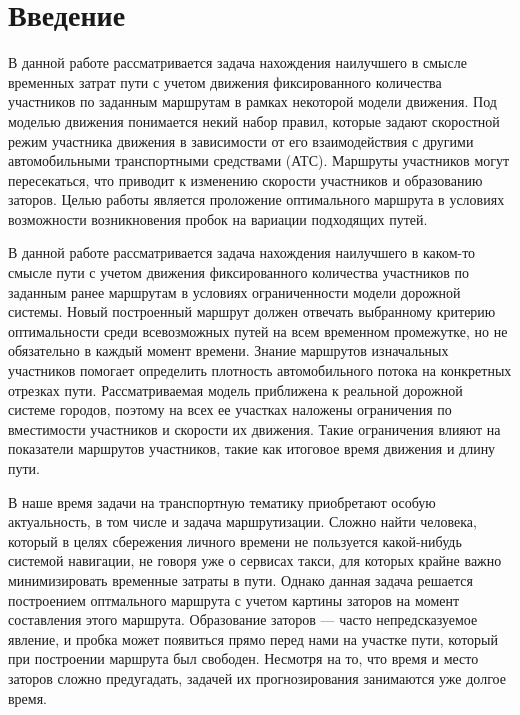 \documentclass[12pt, a4paper]{article}
\begin{document}
	\newpage
	\pagestyle{plain}
	\tableofcontents{}
	
	\newpage	
	
	\section*{Введение}
	
	В данной работе рассматривается задача нахождения наилучшего в смысле временных затрат пути с учетом движения фиксированного количества участников по заданным маршрутам в рамках некоторой модели движения. Под моделью движения понимается некий набор правил, которые задают скоростной режим участника движения в зависимости от его взаимодействия с другими автомобильными транспортными средствами (АТС). Маршруты участников могут пересекаться, что приводит к изменению скорости участников и образованию заторов. Целью работы является проложение оптимального маршрута в условиях возможности возникновения пробок на вариации подходящих путей.
	
	
	В данной работе рассматривается задача нахождения наилучшего в каком-то смысле пути с учетом движения фиксированного количества участников по заданным ранее маршрутам в условиях ограниченности модели дорожной системы. Новый построенный маршрут должен отвечать выбранному критерию оптимальности среди всевозможных путей на всем временном промежутке, но не обязательно в каждый момент времени. Знание маршрутов изначальных участников помогает определить плотность автомобильного потока на конкретных отрезках пути. Рассматриваемая модель приближена к реальной дорожной системе городов, поэтому на всех ее участках наложены ограничения по вместимости участников и скорости их движения. Такие ограничения влияют на показатели маршрутов участников, такие как итоговое время движения и длину пути. 
	\fi
	
	В наше время задачи на транспортную тематику приобретают особую актуальность, в том числе и задача маршрутизации. Сложно найти человека, который в целях сбережения личного времени не пользуется какой-нибудь системой навигации, не говоря уже о сервисах такси, для которых крайне важно минимизировать временные затраты в пути. Однако данная задача решается построением оптмального маршрута с учетом картины заторов на момент составления этого маршрута. Образование заторов --- часто непредсказуемое явление, и пробка может появиться прямо перед нами на участке пути, который при построении маршрута был свободен. Несмотря на то, что время и место заторов сложно предугадать, задачей их прогнозирования занимаются уже долгое время.
	
\end{document}
